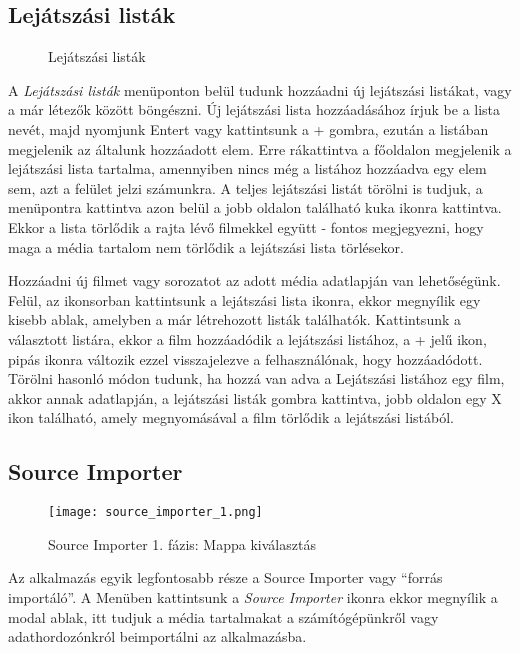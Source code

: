 \subsection{Lejátszási listák}
\begin{figure}[H]
	\centering
	\hspace{5pt}
	\caption{Lejátszási listák}
	\label{fig:playlists}
\end{figure}
A {\it Lejátszási listák} menüponton belül tudunk hozzáadni új lejátszási listákat, vagy a már létezők között böngészni. Új lejátszási lista hozzáadásához írjuk be a lista nevét, majd nyomjunk Entert vagy kattintsunk a + gombra, ezután a listában megjelenik az általunk hozzáadott elem. Erre rákattintva a főoldalon megjelenik a lejátszási lista tartalma, amennyiben nincs még a listához hozzáadva egy elem sem, azt a felület jelzi számunkra. A teljes lejátszási listát törölni is tudjuk, a menüpontra kattintva azon belül a jobb oldalon található kuka ikonra kattintva. Ekkor a lista törlődik a rajta lévő filmekkel együtt - fontos megjegyezni, hogy maga a média tartalom nem törlődik a lejátszási lista törlésekor.

Hozzáadni új filmet vagy sorozatot az adott média adatlapján van lehetőségünk. Felül, az ikonsorban kattintsunk a lejátszási lista ikonra, ekkor megnyílik egy kisebb ablak, amelyben a már létrehozott listák találhatók. Kattintsunk a választott listára, ekkor a film hozzáadódik a lejátszási listához, a + jelű ikon, pipás ikonra változik ezzel visszajelezve a felhasználónak, hogy hozzáadódott. Törölni hasonló módon tudunk, ha hozzá van adva a Lejátszási listához egy film, akkor annak adatlapján, a lejátszási listák gombra kattintva, jobb oldalon egy X ikon található, amely megnyomásával a film törlődik a lejátszási listából.

\subsection{Source Importer}
\begin{figure}[H]
	\centering
	\texttt{[image: source\_importer\_1.png]}
	\caption{Source Importer 1. fázis: Mappa kiválasztás}
	\label{fig:source_importer_1}
\end{figure}
Az alkalmazás egyik legfontosabb része a Source Importer vagy ``forrás importáló''. A Menüben kattintsunk a {\it Source Importer} ikonra ekkor megnyílik a modal ablak, itt tudjuk a média tartalmakat a számítógépünkről vagy adathordozónkról beimportálni az alkalmazásba.

